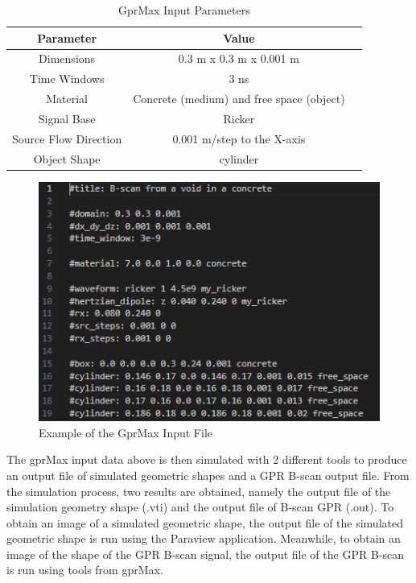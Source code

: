 \documentclass[conference]{IEEEtran}
\begin{document}
\begin{table}[htbp]
    \caption{GprMax Input Parameters}
    \begin{center}
    \begin{tabular}{|c|c|c|}
    \hline
    \textbf{Parameter} & \textbf{Value} \\
    \hline
    Dimensions                    & 0.3 m x 0.3 m x 0.001 m                   \\
    Time Windows                  & 3 ns                                      \\
    Material                      & Concrete (medium) and free space (object) \\
    Signal Base                   & Ricker                                    \\
    Source Flow Direction         & 0.001 m/step to the X-axis                \\
    Object Shape                  & cylinder                                  \\
    \hline
    \end{tabular}
    \label{tb:inputGPR}
    \end{center}
\end{table}

\begin{figure}[ht]
  \centering
  \includegraphics[scale=0.6]{gambar/inputGprMax.png}
  \caption{Example of the GprMax Input File}
  \label{fig:inputgprMax}
\end{figure}

The gprMax input data above is then simulated with 2 different tools to produce an output file of simulated geometric shapes and a GPR B-scan output file. 
From the simulation process, two results are obtained, namely the output file of the simulation geometry shape (.vti) and the output file of B-scan GPR (.out). 
To obtain an image of a simulated geometric shape, the output file of the simulated geometric shape is run using the Paraview application. 
Meanwhile, to obtain an image of the shape of the GPR B-scan signal, the output file of the GPR B-scan is run using tools from gprMax.
\end{document}
